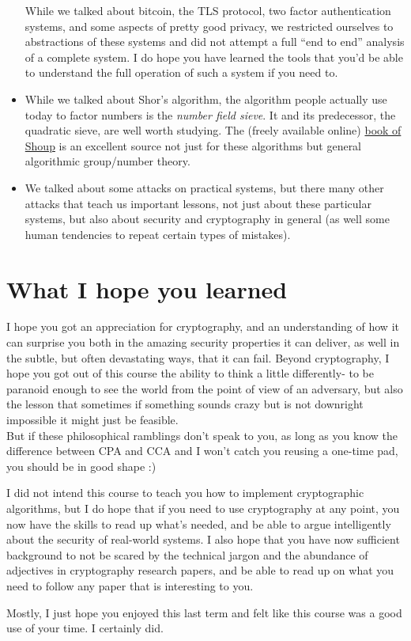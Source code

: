 \begin{itemize}
  While we talked about bitcoin, the TLS protocol, two factor
  authentication systems, and some aspects of pretty good privacy, we
  restricted ourselves to abstractions of these systems and did not
  attempt a full ``end to end'' analysis of a complete system. I do hope
  you have learned the tools that you'd be able to understand the full
  operation of such a system if you need to.
\item
  While we talked about Shor's algorithm, the algorithm people actually
  use today to factor numbers is the \emph{number field sieve}. It and
  its predecessor, the quadratic sieve, are well worth studying. The
  (freely available online) \href{http://www.shoup.net/ntb/}{book of
  Shoup} is an excellent source not just for these algorithms but
  general algorithmic group/number theory.
\item
  We talked about some attacks on practical systems, but there many
  other attacks that teach us important lessons, not just about these
  particular systems, but also about security and cryptography in
  general (as well some human tendencies to repeat certain types of
  mistakes).
\end{itemize}

\section{What I hope you learned}\label{What-I-hope-you-learned}

I hope you got an appreciation for cryptography, and an understanding of
how it can surprise you both in the amazing security properties it can
deliver, as well in the subtle, but often devastating ways, that it can
fail. Beyond cryptography, I hope you got out of this course the ability
to think a little differently- to be paranoid enough to see the world
from the point of view of an adversary, but also the lesson that
sometimes if something sounds crazy but is not downright impossible it
might just be feasible.\\
But if these philosophical ramblings don't speak to you, as long as you
know the difference between CPA and CCA and I won't catch you reusing a
one-time pad, you should be in good shape :)

I did not intend this course to teach you how to implement cryptographic
algorithms, but I do hope that if you need to use cryptography at any
point, you now have the skills to read up what's needed, and be able to
argue intelligently about the security of real-world systems. I also
hope that you have now sufficient background to not be scared by the
technical jargon and the abundance of adjectives in cryptography
research papers, and be able to read up on what you need to follow any
paper that is interesting to you.

Mostly, I just hope you enjoyed this last term and felt like this course
was a good use of your time. I certainly did.
